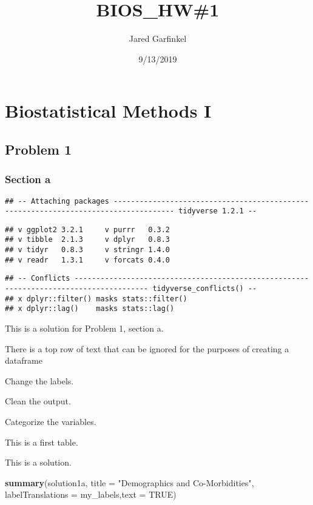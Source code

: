 \documentclass[]{article}
\title{BIOS\_HW\#1}
\author{Jared Garfinkel}
\date{9/13/2019}
\newenvironment{Shaded}{\begin{snugshade}}{\end{snugshade}}
\newcommand{\DataTypeTok}[1]{\textcolor[rgb]{0.13,0.29,0.53}{#1}}
\newcommand{\KeywordTok}[1]{\textcolor[rgb]{0.13,0.29,0.53}{\textbf{#1}}}
\newcommand{\NormalTok}[1]{#1}
\newcommand{\OtherTok}[1]{\textcolor[rgb]{0.56,0.35,0.01}{#1}}
\newcommand{\StringTok}[1]{\textcolor[rgb]{0.31,0.60,0.02}{#1}}
\begin{document}
\maketitle

\hypertarget{biostatistical-methods-i}{%
\section{Biostatistical Methods I}\label{biostatistical-methods-i}}

\hypertarget{problem-1}{%
\subsection{Problem 1}\label{problem-1}}

\hypertarget{section-a}{%
\subsubsection{Section a}\label{section-a}}

\begin{verbatim}
## -- Attaching packages ------------------------------------------------------------------------------------ tidyverse 1.2.1 --
\end{verbatim}

\begin{verbatim}
## v ggplot2 3.2.1     v purrr   0.3.2
## v tibble  2.1.3     v dplyr   0.8.3
## v tidyr   0.8.3     v stringr 1.4.0
## v readr   1.3.1     v forcats 0.4.0
\end{verbatim}

\begin{verbatim}
## -- Conflicts --------------------------------------------------------------------------------------- tidyverse_conflicts() --
## x dplyr::filter() masks stats::filter()
## x dplyr::lag()    masks stats::lag()
\end{verbatim}

This is a solution for Problem 1, section a.

There is a top row of text that can be ignored for the purposes of
creating a dataframe

Change the labels.

Clean the output.

Categorize the variables.

This is a first table.

This is a solution.

\begin{Shaded}
\begin{Highlighting}[]
\KeywordTok{summary}\NormalTok{(solution1a, }\DataTypeTok{title =} \StringTok{"Demographics and Co-Morbidities"}\NormalTok{, }\DataTypeTok{labelTranslations =}\NormalTok{ my_labels,}\DataTypeTok{text =} \OtherTok{TRUE}\NormalTok{)}
\end{Highlighting}
\end{Shaded}
\end{document}

